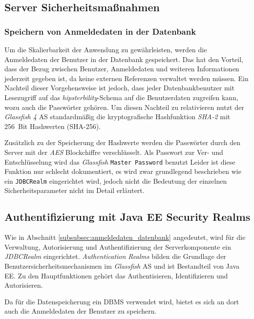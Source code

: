 \subsection{Server Sicherheitsmaßnahmen}

\subsubsection{Speichern von Anmeldedaten in der Datenbank\label{subsubsec:anmeldedaten_datenbank}}
Um die Skalierbarkeit der Anwendung zu gewährleisten, werden die Anmeldedaten der Benutzer in der Datenbank gespeichert.
Das hat den Vorteil, dass der Bezug zwischen Benutzer, Anmeldedaten und weiteren Informationen jederzeit gegeben ist, da keine externen Referenzen verwaltet werden müssen.
Ein Nachteil dieser Vorgehensweise ist jedoch, dass jeder Datenbankbenutzer mit Lesezugriff auf das \emph{hipsterbility}-Schema auf die Benutzerdaten zugreifen kann, wozu auch die Passwörter gehören.
Um diesen Nachteil zu relativieren nutzt der \emph{Glassfish 4} \ac{AS} standardmäßig die kryptografische Hashfunktion \emph{\ac{SHA}-2} mit 256~Bit Hashwerten (\ac{SHA}-256).

Zusätzlich zu der Speicherung der Hashwerte werden die Passwörter durch den Server mit der \emph{\ac{AES}} Blockchiffre verschlüsselt.
Als Passwort zur Ver- und Entschlüsselung wird das \emph{Glassfish} \texttt{Master Password} benutzt \cite[vgl.][16\psq]{OracleCorporation.2013}
Leider ist diese Funktion nur schlecht dokumentiert, es wird zwar grundlegend beschrieben wie ein \texttt{JDBCRealm} eingerichtet wird, jedoch nicht die Bedeutung der einzelnen Sicherheitsparameter \cite[vgl.][50\psq]{OracleCorporation.2013} nicht im Detail erläutert.

\subsection{Authentifizierung mit Java EE Security Realms}
Wie in Abschnitt \ref{subsubsec:anmeldedaten_datenbank} angedeutet, wird für die Verwaltung, Autorisierung und Authentifizierung der Serverkomponente ein \emph{JDBCRealm} eingerichtet.
\emph{Authentication Realms} bilden die Grundlage der Benutzersicherheitsmechanismen im \emph{Glassfish} \ac{AS} und ist Bestandteil von Java EE.
Zu den Hauptfunktionen gehört das Authentisieren, Identifizieren und Autorisieren.

Da für die Datenspeicherung ein \ac{DBMS} verwendet wird, bietet es sich an dort auch die Anmeldedaten der Benutzer zu speichern.

